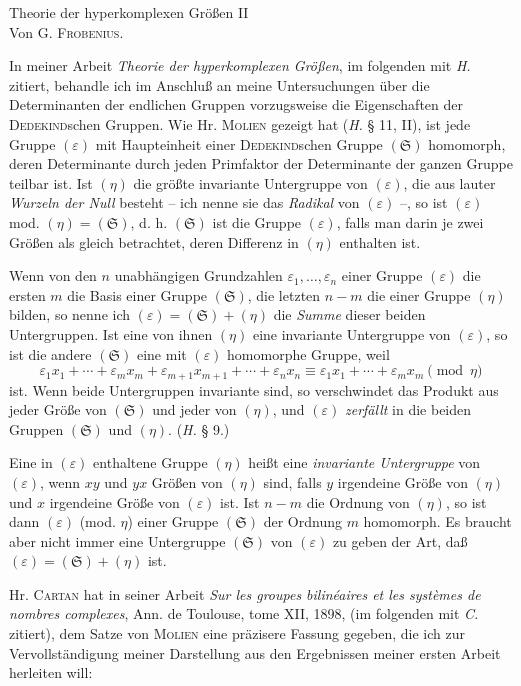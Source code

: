 \documentclass[11pt]{article}
\newcommand{\eps}{\varepsilon}
\newcommand{\frobtitle}[1]{\begin{center}{\Large #1}\\[0.75em]Von G. \textsc{Frobenius}.\end{center}\vspace{0.5em}}
\newcommand{\grS}{\mathfrak{S}}
\begin{document}
\clearpage

\frobtitle{Theorie der hyperkomplexen Größen II}

In meiner Arbeit \emph{Theorie der hyperkomplexen Größen}, im folgenden mit \emph{H.} zitiert, behandle ich im Anschluß an meine Untersuchungen über die Determinanten der endlichen Gruppen vorzugsweise die Eigenschaften der \textsc{Dedekind}schen Gruppen. Wie Hr. \textsc{Molien} gezeigt hat (\emph{H.} § 11, II), ist jede Gruppe $(\eps)$ mit Haupteinheit einer \textsc{Dedekind}schen Gruppe $(\grS)$ homomorph, deren Determinante durch jeden Primfaktor der Determinante der ganzen Gruppe teilbar ist. Ist $(\eta)$ die größte invariante Untergruppe von $(\eps)$, die aus lauter \emph{Wurzeln der Null} besteht -- ich nenne sie das \emph{Radikal} von $(\eps)$ --, so ist $(\eps)$ mod. $(\eta)=(\grS)$, d. h. $(\grS)$ ist die Gruppe $(\eps)$, falls man darin je zwei Größen als gleich betrachtet, deren Differenz in $(\eta)$ enthalten ist.

Wenn von den $n$ unabhängigen Grundzahlen $\eps_1,\ldots,\eps_n$ einer Gruppe $(\eps)$ die ersten $m$ die Basis einer Gruppe $(\grS)$, die letzten $n-m$ die einer Gruppe $(\eta)$ bilden, so nenne ich $(\eps)=(\grS)+(\eta)$ die \emph{Summe} dieser beiden Untergruppen. Ist eine von ihnen $(\eta)$ eine invariante Untergruppe von $(\eps)$, so ist die andere $(\grS)$ eine mit $(\eps)$ homomorphe Gruppe, weil
\[
 \eps_1x_1+\cdots+\eps_mx_m+\eps_{m+1}x_{m+1}+\cdots+\eps_nx_n
 \equiv \eps_1x_1+\cdots+\eps_mx_m \pmod{\eta}
\]
ist. Wenn beide Untergruppen invariante sind, so verschwindet das Produkt aus jeder Größe von $(\grS)$ und jeder von $(\eta)$, und $(\eps)$ \emph{zerfällt} in die beiden Gruppen $(\grS)$ und $(\eta)$. (\emph{H.} § 9.)

Eine in $(\eps)$ enthaltene Gruppe $(\eta)$ heißt eine \emph{invariante Untergruppe} von $(\eps)$, wenn $xy$ und $yx$ Größen von $(\eta)$ sind, falls $y$ irgendeine Größe von $(\eta)$ und $x$ irgendeine Größe von $(\eps)$ ist. Ist $n-m$ die Ordnung von $(\eta)$, so ist dann $(\eps)$ (mod. $\eta$) einer Gruppe $(\grS)$ der Ordnung $m$ homomorph. Es braucht aber nicht immer eine Untergruppe $(\grS)$ von $(\eps)$ zu geben der Art, daß $(\eps)=(\grS)+(\eta)$ ist.

Hr. \textsc{Cartan} hat in seiner Arbeit \emph{Sur les groupes bilinéaires et les systèmes de nombres complexes}, Ann. de Toulouse, tome XII, 1898, (im folgenden mit \emph{C.} zitiert), dem Satze von \textsc{Molien} eine präzisere Fassung gegeben, die ich zur Vervollständigung meiner Darstellung aus den Ergebnissen meiner ersten Arbeit herleiten will:
\end{document}

